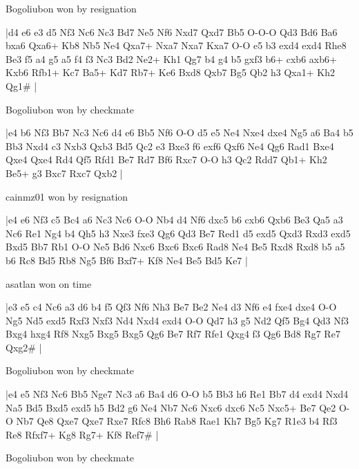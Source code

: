 Bogoliubon won by resignation

\makegametitle
|d4 e6 e3 d5 Nf3 Nc6 Nc3 Bd7 Ne5 Nf6 Nxd7 Qxd7 Bb5 O-O-O Qd3 Bd6 Ba6 bxa6 Qxa6+ Kb8 Nb5 Ne4 Qxa7+ Nxa7 Nxa7 Kxa7 O-O e5 b3 exd4 exd4 Rhe8 Be3 f5 a4 g5 a5 f4 f3 Nc3 Bd2 Ne2+ Kh1 Qg7 b4 g4 b5 gxf3 b6+ cxb6 axb6+ Kxb6 Rfb1+ Kc7 Ba5+ Kd7 Rb7+ Ke6 Bxd8 Qxb7 Bg5 Qb2 h3 Qxa1+ Kh2 Qg1\#  |

\showboard

Bogoliubon won by checkmate

\makegametitle
|e4 b6 Nf3 Bb7 Nc3 Nc6 d4 e6 Bb5 Nf6 O-O d5 e5 Ne4 Nxe4 dxe4 Ng5 a6 Ba4 b5 Bb3 Nxd4 c3 Nxb3 Qxb3 Bd5 Qc2 e3 Bxe3 f6 exf6 Qxf6 Ne4 Qg6 Rad1 Bxe4 Qxe4 Qxe4 Rd4 Qf5 Rfd1 Be7 Rd7 Bf6 Rxc7 O-O h3 Qc2 Rdd7 Qb1+ Kh2 Be5+ g3 Bxc7 Rxc7 Qxb2  |

\showboard

cainmz01 won by resignation

\makegametitle
|e4 e6 Nf3 c5 Bc4 a6 Nc3 Nc6 O-O Nb4 d4 Nf6 dxc5 b6 cxb6 Qxb6 Be3 Qa5 a3 Nc6 Re1 Ng4 b4 Qh5 h3 Nxe3 fxe3 Qg6 Qd3 Be7 Red1 d5 exd5 Qxd3 Rxd3 exd5 Bxd5 Bb7 Rb1 O-O Ne5 Bd6 Nxc6 Bxc6 Bxc6 Rad8 Ne4 Be5 Rxd8 Rxd8 b5 a5 b6 Rc8 Bd5 Rb8 Ng5 Bf6 Bxf7+ Kf8 Ne4 Be5 Bd5 Ke7  |

\showboard

asatlan won on time

\makegametitle
|e3 e5 c4 Nc6 a3 d6 b4 f5 Qf3 Nf6 Nh3 Be7 Be2 Ne4 d3 Nf6 e4 fxe4 dxe4 O-O Ng5 Nd5 exd5 Rxf3 Nxf3 Nd4 Nxd4 exd4 O-O Qd7 h3 g5 Nd2 Qf5 Bg4 Qd3 Nf3 Bxg4 hxg4 Rf8 Nxg5 Bxg5 Bxg5 Qg6 Be7 Rf7 Rfe1 Qxg4 f3 Qg6 Bd8 Rg7 Re7 Qxg2\#  |

\showboard

Bogoliubon won by checkmate

\makegametitle
|e4 e5 Nf3 Nc6 Bb5 Nge7 Nc3 a6 Ba4 d6 O-O b5 Bb3 h6 Re1 Bb7 d4 exd4 Nxd4 Na5 Bd5 Bxd5 exd5 h5 Bd2 g6 Ne4 Nb7 Nc6 Nxc6 dxc6 Nc5 Nxc5+ Be7 Qe2 O-O Nb7 Qe8 Qxe7 Qxe7 Rxe7 Rfc8 Bh6 Rab8 Rae1 Kh7 Bg5 Kg7 R1e3 b4 Rf3 Re8 Rfxf7+ Kg8 Rg7+ Kf8 Ref7\#  |

\showboard

Bogoliubon won by checkmate

